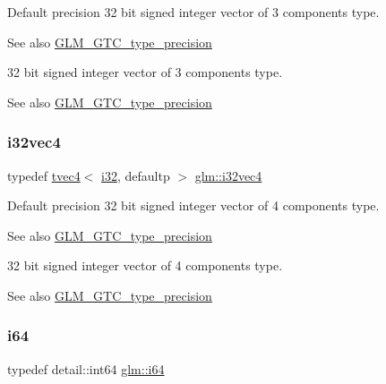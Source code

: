 Default precision 32 bit signed integer vector of 3 components type. \begin{DoxySeeAlso}{See also}
\hyperlink{group__gtc__type__precision}{G\+L\+M\+\_\+\+G\+T\+C\+\_\+type\+\_\+precision}
\end{DoxySeeAlso}
32 bit signed integer vector of 3 components type. \begin{DoxySeeAlso}{See also}
\hyperlink{group__gtc__type__precision}{G\+L\+M\+\_\+\+G\+T\+C\+\_\+type\+\_\+precision} 
\end{DoxySeeAlso}
\mbox{\label{group__gtc__type__precision_ga3ada3676600db65a425058c0a150d83e}} 
\subsubsection{\texorpdfstring{i32vec4}{i32vec4}}
{\footnotesize\ttfamily typedef \hyperlink{structglm_1_1tvec4}{tvec4}$<$ \hyperlink{group__gtc__type__precision_ga1d8ed5c43e91ea7d4528389da4fa9524}{i32}, defaultp $>$ \hyperlink{group__gtc__type__precision_ga3ada3676600db65a425058c0a150d83e}{glm\+::i32vec4}}

Default precision 32 bit signed integer vector of 4 components type. \begin{DoxySeeAlso}{See also}
\hyperlink{group__gtc__type__precision}{G\+L\+M\+\_\+\+G\+T\+C\+\_\+type\+\_\+precision}
\end{DoxySeeAlso}
32 bit signed integer vector of 4 components type. \begin{DoxySeeAlso}{See also}
\hyperlink{group__gtc__type__precision}{G\+L\+M\+\_\+\+G\+T\+C\+\_\+type\+\_\+precision} 
\end{DoxySeeAlso}
\mbox{\label{group__gtc__type__precision_gac7a7eaad46064fc952b06df33689da23}} 
\subsubsection{\texorpdfstring{i64}{i64}}
{\footnotesize\ttfamily typedef detail\+::int64 \hyperlink{group__gtc__type__precision_gac7a7eaad46064fc952b06df33689da23}{glm\+::i64}}

